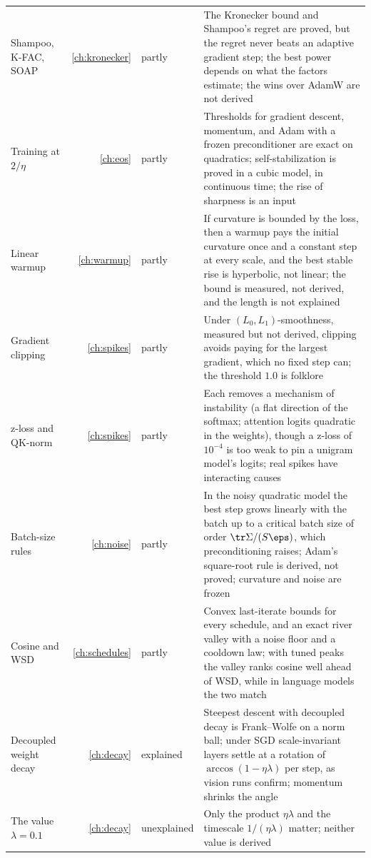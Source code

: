 \begin{refsection}
\begin{table}[p]
\begin{fullwidth}
\begin{tabular}{@{}>{\raggedright\arraybackslash}p{31mm}r>{\raggedright\arraybackslash}p{17mm}>{\raggedright\arraybackslash}p{104mm}@{}}
Shampoo, K-FAC, SOAP & \ref{ch:kronecker} & partly & The Kronecker bound and Shampoo's regret are proved, but the regret never beats an adaptive gradient step; the best power depends on what the factors estimate; the wins over AdamW are not derived\\
Training at $2/\eta$ & \ref{ch:eos} & partly & Thresholds for gradient descent, momentum, and Adam with a frozen preconditioner are exact on quadratics; self-stabilization is proved in a cubic model, in continuous time; the rise of sharpness is an input\\
Linear warmup & \ref{ch:warmup} & partly & If curvature is bounded by the loss, then a warmup pays the initial curvature once and a constant step at every scale, and the best stable rise is hyperbolic, not linear; the bound is measured, not derived, and the length is not explained\\
Gradient clipping & \ref{ch:spikes} & partly & Under $(L_0,L_1)$-smoothness, measured but not derived, clipping avoids paying for the largest gradient, which no fixed step can; the threshold $1.0$ is folklore\\
z-loss and QK-norm & \ref{ch:spikes} & partly & Each removes a mechanism of instability (a flat direction of the softmax; attention logits quadratic in the weights), though a z-loss of $10^{-4}$ is too weak to pin a unigram model's logits; real spikes have interacting causes\\
Batch-size rules & \ref{ch:noise} & partly & In the noisy quadratic model the best step grows linearly with the batch up to a critical batch size of order $\tr\Sigma/(S\eps)$, which preconditioning raises; Adam's square-root rule is derived, not proved; curvature and noise are frozen\\
Cosine and WSD & \ref{ch:schedules} & partly & Convex last-iterate bounds for every schedule, and an exact river valley with a noise floor and a cooldown law; with tuned peaks the valley ranks cosine well ahead of WSD, while in language models the two match\\
Decoupled weight decay & \ref{ch:decay} & explained & Steepest descent with decoupled decay is Frank--Wolfe on a norm ball; under SGD scale-invariant layers settle at a rotation of $\arccos(1-\eta\lambda)$ per step, as vision runs confirm; momentum shrinks the angle\\
The value $\lambda=0.1$ & \ref{ch:decay} & unexplained & Only the product $\eta\lambda$ and the timescale $1/(\eta\lambda)$ matter; neither value is derived\\

\end{tabular}
\end{fullwidth}
\end{table}
\end{refsection}
